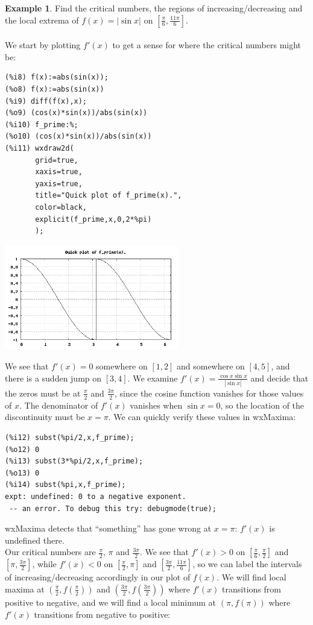\documentclass[10.5pt,twoside]{report}
\theoremstyle{definition}
\newtheorem{exmp}{Example}[section]
\begin{document}
\begin{exmp}

Find the critical numbers, the regions of increasing/decreasing and the local extrema of $f(x)=|\sin{x}|$ on $[\frac{\pi}{6},\frac{11\pi}{6}]$.\\
${}$\\

We start by plotting $f'(x)$ to get a sense for where the critical numbers might be:

\begin{verbatim}
(%i8) f(x):=abs(sin(x));
(%o8) f(x):=abs(sin(x))
(%i9) diff(f(x),x);
(%o9) (cos(x)*sin(x))/abs(sin(x))
(%i10) f_prime:%;
(%o10) (cos(x)*sin(x))/abs(sin(x))
(%i11) wxdraw2d(
       grid=true,
       xaxis=true,
       yaxis=true,
       title="Quick plot of f_prime(x).",
       color=black,
       explicit(f_prime,x,0,2*%pi)
       );
\end{verbatim}

\includegraphics[width=3in]{example_5_1_2_1}

We see that $f'(x)=0$ somewhere on $[1,2]$ and somewhere on $[4,5]$, and there is a sudden jump on $[3,4]$. We examine $f'(x)=\frac{\cos{x}\sin{x}}{|\sin{x}|}$ and decide that the zeros must be at $\frac{\pi}{2}$ and $\frac{3\pi}{2}$, since the cosine function vanishes for those values of $x$.  The denominator of $f'(x)$ vanishes when $\sin{x}=0$, so the location of the discontinuity must be $x=\pi$.  We can quickly verify these values in wxMaxima:

\begin{verbatim}
(%i12) subst(%pi/2,x,f_prime);
(%o12) 0
(%i13) subst(3*%pi/2,x,f_prime);
(%o13) 0
(%i14) subst(%pi,x,f_prime);
expt: undefined: 0 to a negative exponent.
 -- an error. To debug this try: debugmode(true);
\end{verbatim}

wxMaxima detects that ``something'' has gone wrong at $x=\pi$: $f'(x)$ is undefined there.\\

Our critical numbers are $\frac{\pi}{2}$, $\pi$ and $\frac{3\pi}{2}$.  We see that $f'(x)>0$ on $[\frac{\pi}{6},\frac{\pi}{2}]$ and $[\pi,\frac{3\pi}{2}]$, while $f'(x)<0$ on $[\frac{\pi}{2},\pi]$ and $[\frac{3\pi}{2},\frac{11\pi}{6}]$, so we can label the intervals of increasing/decreasing accordingly in our plot of $f(x)$.  We will find local maxima at $(\frac{\pi}{2},f(\frac{\pi}{2}))$ and $(\frac{3\pi}{2},f(\frac{3\pi}{2}))$ where $f'(x)$ transitions from positive to negative, and we will find a local minimum at $(\pi,f(\pi))$ where $f'(x)$ transitions from negative to positive:


\end{exmp}
\end{document}
